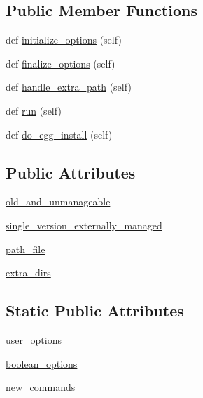 \subsection*{Public Member Functions}
\begin{DoxyCompactItemize}
\item 
def \hyperlink{classsetuptools_1_1command_1_1install_1_1install_ae8b8774d2a59024777c3c2042121a0a6}{initialize\+\_\+options} (self)
\item 
def \hyperlink{classsetuptools_1_1command_1_1install_1_1install_aa68ab08ede694260b838e49ad820732e}{finalize\+\_\+options} (self)
\item 
def \hyperlink{classsetuptools_1_1command_1_1install_1_1install_a1621318085a84e482b1f20d48e74b590}{handle\+\_\+extra\+\_\+path} (self)
\item 
def \hyperlink{classsetuptools_1_1command_1_1install_1_1install_a836001d2333653e5ee3163aa4c805e6e}{run} (self)
\item 
def \hyperlink{classsetuptools_1_1command_1_1install_1_1install_a96fdffd6145de3296ee08ef3dd51ed2b}{do\+\_\+egg\+\_\+install} (self)
\end{DoxyCompactItemize}
\subsection*{Public Attributes}
\begin{DoxyCompactItemize}
\item 
\hyperlink{classsetuptools_1_1command_1_1install_1_1install_ad632056e38380043f49eaf7eabbe08a5}{old\+\_\+and\+\_\+unmanageable}
\item 
\hyperlink{classsetuptools_1_1command_1_1install_1_1install_a7a20443140985362c236e68aca2f8f55}{single\+\_\+version\+\_\+externally\+\_\+managed}
\item 
\hyperlink{classsetuptools_1_1command_1_1install_1_1install_a511be215285c366911de400d05cbecb8}{path\+\_\+file}
\item 
\hyperlink{classsetuptools_1_1command_1_1install_1_1install_a5cc3711524f10b2e6c261bd50a975ef4}{extra\+\_\+dirs}
\end{DoxyCompactItemize}
\subsection*{Static Public Attributes}
\begin{DoxyCompactItemize}
\item 
\hyperlink{classsetuptools_1_1command_1_1install_1_1install_a4f9ca37416e4efa7d7fe6425cf86883a}{user\+\_\+options}
\item 
\hyperlink{classsetuptools_1_1command_1_1install_1_1install_a756b6cae4d9e0e49b62322c72d9b3708}{boolean\+\_\+options}
\item 
\hyperlink{classsetuptools_1_1command_1_1install_1_1install_aa26f810da22babc702f61f206482da7f}{new\+\_\+commands}
\end{DoxyCompactItemize}


